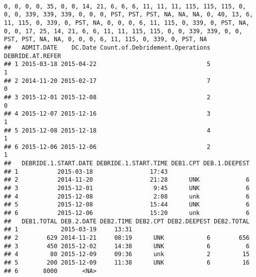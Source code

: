 \documentclass[]{article}
\begin{document}
\begin{verbatim}
                                                                                                                                                                                                                                                                                                                                                                                                                                                                                                                                                                                                                                                                                                                                                                                                                              0, 0, 0, 0, 35, 0, 0, 14, 21, 6, 6, 6, 11, 11, 11, 115, 115, 115, 0, 0, 0, 339, 339, 339, 0, 0, 0, PST, PST, PST, NA, NA, NA, 0, 40, 13, 6, 11, 115, 0, 339, 0, PST, NA, 0, 0, 0, 6, 11, 115, 0, 339, 0, PST, NA, 0, 0, 17, 25, 14, 21, 6, 6, 11, 11, 115, 115, 0, 0, 339, 339, 0, 0, PST, PST, NA, NA, 0, 0, 0, 6, 11, 115, 0, 339, 0, PST, NA
##   ADMIT.DATE    DC.Date Count.of.Debridement.Operations DEBRIDE.AT.REFER
## 1 2015-03-18 2015-04-22                               5                1
## 2 2014-11-20 2015-02-17                               7                0
## 3 2015-12-01 2015-12-08                               2                0
## 4 2015-12-07 2015-12-16                               3                1
## 5 2015-12-08 2015-12-18                               4                1
## 6 2015-12-06 2015-12-06                               2                1
##   DEBRIDE.1.START.DATE DEBRIDE.1.START.TIME DEB1.CPT DEB.1.DEEPEST
## 1           2015-03-18                17:43                       
## 2           2014-11-20                21:28      UNK             6
## 3           2015-12-01                 9:45      UNK             6
## 4           2015-12-08                 2:08      unk             6
## 5           2015-12-08                15:44      UNK             6
## 6           2015-12-06                15:20      unk             6
##   DEB1.TOTAL DEB.2.DATE DEB2.TIME DEB2.CPT DEB2.DEEPEST DEB2.TOTAL
## 1            2015-03-19     13:31                                 
## 2        629 2014-11-21     08:19      UNK            6        656
## 3        450 2015-12-02     14:38      UNK            6          6
## 4         80 2015-12-09     09:36      unk            2         15
## 5        200 2015-12-09     11:38      UNK            6         16
## 6       8000       <NA>                                           

\end{verbatim}
\end{document}

